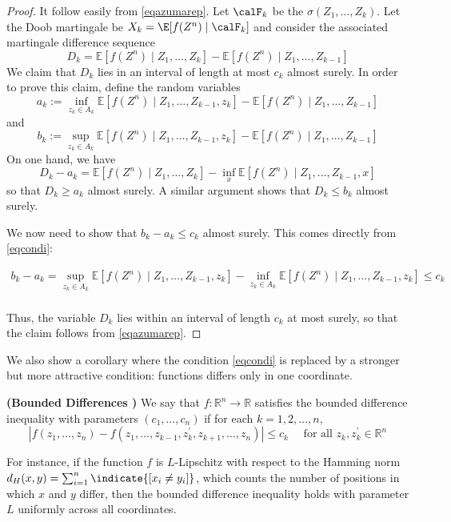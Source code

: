 \documentclass{article}
\newcommand{\bfs}[1]{\textbf{({#1})}}
\begin{document}
\begin{proof}
It follow easily from \cref{eqazumarep}. 
Let $\calF_{ k }$ be the $\sigma(Z_{1}, \ldots, Z _{ k }).$ Let the Doob martingale be $X_{ k }= \E [ f (Z^n) \mid \calF_k ]$
and consider the associated martingale difference sequence
$$
D_{k}=\mathbb{E}\left[f(Z^n) \mid Z_{1}, \ldots, Z_{k}\right]-\mathbb{E}\left[f(Z^n) \mid Z_{1}, \ldots, Z_{k-1}\right]
$$
We claim that $D_{k}$ lies in an interval of length at most $c_{k}$ almost surely. In order to prove this claim, define the random variables
$$
a_{k}:=\inf_{z_k\in A_k} \mathbb{E}\left[f(Z^n) \mid Z_{1}, \ldots, Z_{k-1}, z_k\right]-\mathbb{E}\left[f(Z^n) \mid Z_{1}, \ldots, Z_{k-1}\right]
$$
and
$$
b_{k}:=\sup _{z_k\in A_k} \mathbb{E}\left[f(Z^n) \mid Z_{1}, \ldots, Z_{k-1}, z_k\right]-\mathbb{E}\left[f(Z^n) \mid Z_{1}, \ldots, Z_{k-1}\right]
$$
On one hand, we have
$$
D_{k}-a_{k}=\mathbb{E}\left[f(Z^n) \mid Z_{1}, \ldots, Z_{k}\right]-\inf _{x} \mathbb{E}\left[f(Z^n) \mid Z_{1}, \ldots, Z_{k-1}, x\right]
$$
so that $D_{k} \geq a_{k}$ almost surely. A similar argument shows that $D_{k} \leq b_{k}$ almost surely. 

We now need to show that $b_{k}-a_{k} \leq c_{k}$ almost surely. This comes directly from \cref{eqcondi}:

\begin{align*}
    b_{k} - a_{k} =\sup_{z_k\in A_k} \mathbb{E}\left[f(Z^n) \mid Z_{1}, \ldots, Z_{k-1}, z_k\right]-\inf_{z_k\in A_k} \mathbb{E}\left[f(Z^n) \mid Z_{1}, \ldots, Z_{k-1}, z_k\right] \le c_k\\
\end{align*}


Thus, the variable $D_{k}$ lies within an interval of length $c_{k}$ at most surely, so that the claim follows from \cref{eqazumarep}.
\end{proof}

We also show a corollary where the condition \cref{eqcondi} is replaced by a stronger but more attractive condition: functions differs only in one coordinate.
\begin{defa}{\bfs{Bounded Differences }}\label{defboundeddiff}
We say that $f: \mathbb{R}^{n} \rightarrow \mathbb{R}$ satisfies the bounded difference inequality with parameters $\left(c_{1}, \ldots, c_{n}\right)$ if for each $k=1,2, \ldots, n$,
$$
\left|f\left(z_{1}, \ldots, z_{n}\right)-f\left(z_{1}, \ldots, z_{k-1}, z_{k}^{\prime}, z_{k+1}, \ldots, z_{n}\right)\right| \leq c_{k} \quad \text { for all } z_k, z_k^{\prime} \in \mathbb{R}^{n}
$$
\end{defa}
\begin{exma}
For instance, if the function $f$ is $L$-Lipschitz with respect to the Hamming norm $d_{H}(x, y)=\sum_{i=1}^{n} \indicate{\left[x_{i} \neq y_{i}\right]}$, which counts the number of positions in which $x$ and $y$ differ, then the bounded difference inequality holds with parameter $L$ uniformly across
all coordinates.
\end{exma}
\end{document}
